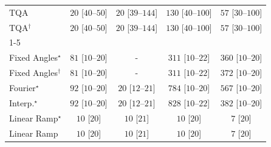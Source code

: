 \begin{tabular}{l|cccc|}
TQA & {\cellcolor[HTML]{F5FBF2}} \color[HTML]{000000} $20$ [$40$--$50$] & {\cellcolor[HTML]{F5FBF2}} \color[HTML]{000000} $20$ [$39$--$144$] & {\cellcolor[HTML]{DFF3DA}} \color[HTML]{000000} $130$ [$40$--$100$] & {\cellcolor[HTML]{EFF9EB}} \color[HTML]{000000} $57$ [$30$--$100$] \\
TQA$^\dagger$ & {\cellcolor[HTML]{F5FBF2}} \color[HTML]{000000} $20$ [$40$--$50$] & {\cellcolor[HTML]{F5FBF2}} \color[HTML]{000000} $20$ [$39$--$144$] & {\cellcolor[HTML]{DFF3DA}} \color[HTML]{000000} $130$ [$40$--$100$] & {\cellcolor[HTML]{EFF9EB}} \color[HTML]{000000} $57$ [$30$--$100$] \\
\cline{1-5}
\multicolumn{5}{c}{\rule{0pt}{8pt}SV} \\
\midrule
Fixed Angles$^\star$ & {\cellcolor[HTML]{EAF7E6}} \color[HTML]{000000} $81$ [$10$--$20$] & {\cellcolor[HTML]{000000}} \color[HTML]{F1F1F1} {\cellcolor{white}} \color{black} - & {\cellcolor[HTML]{A3DA9D}} \color[HTML]{000000} $311$ [$10$--$22$] & {\cellcolor[HTML]{8DD08A}} \color[HTML]{000000} $360$ [$10$--$20$] \\
Fixed Angles$^\dagger$ & {\cellcolor[HTML]{EAF7E6}} \color[HTML]{000000} $81$ [$10$--$20$] & {\cellcolor[HTML]{000000}} \color[HTML]{F1F1F1} {\cellcolor{white}} \color{black} - & {\cellcolor[HTML]{A3DA9D}} \color[HTML]{000000} $311$ [$10$--$22$] & {\cellcolor[HTML]{88CE87}} \color[HTML]{000000} $372$ [$10$--$20$] \\
Fourier$^\star$ & {\cellcolor[HTML]{E8F6E4}} \color[HTML]{000000} $92$ [$10$--$20$] & {\cellcolor[HTML]{F5FBF2}} \color[HTML]{000000} $20$ [$12$--$21$] & {\cellcolor[HTML]{005522}} \color[HTML]{F1F1F1} $784$ [$10$--$20$] & {\cellcolor[HTML]{339C52}} \color[HTML]{F1F1F1} $567$ [$10$--$20$] \\
Interp.$^\star$ & {\cellcolor[HTML]{E8F6E4}} \color[HTML]{000000} $92$ [$10$--$20$] & {\cellcolor[HTML]{F5FBF2}} \color[HTML]{000000} $20$ [$12$--$21$] & {\cellcolor[HTML]{00441B}} \color[HTML]{F1F1F1} $828$ [$10$--$22$] & {\cellcolor[HTML]{84CC83}} \color[HTML]{000000} $382$ [$10$--$20$] \\
Linear Ramp$^\star$ & {\cellcolor[HTML]{F7FCF5}} \color[HTML]{000000} $10$ [$20$] & {\cellcolor[HTML]{F7FCF5}} \color[HTML]{000000} $10$ [$21$] & {\cellcolor[HTML]{F7FCF5}} \color[HTML]{000000} $10$ [$20$] & {\cellcolor[HTML]{F7FCF5}} \color[HTML]{000000} $7$ [$20$] \\
Linear Ramp & {\cellcolor[HTML]{F7FCF5}} \color[HTML]{000000} $10$ [$20$] & {\cellcolor[HTML]{F7FCF5}} \color[HTML]{000000} $10$ [$21$] & {\cellcolor[HTML]{F7FCF5}} \color[HTML]{000000} $10$ [$20$] & {\cellcolor[HTML]{F7FCF5}} \color[HTML]{000000} $7$ [$20$] \\

\end{tabular}
